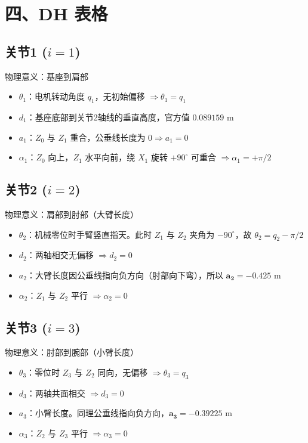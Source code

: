 \documentclass[a4paper,12pt]{article}
\begin{document}
\section*{四、DH 表格}
\subsection*{关节1 ($i=1$)}
物理意义：基座到肩部
\begin{itemize}
    \item $\theta_1$：电机转动角度 $q_1$，无初始偏移 $\Rightarrow \theta_1 = q_1$
    \item $d_1$：基座底部到关节2轴线的垂直高度，官方值 $0.089159$ m
    \item $a_1$：$Z_0$ 与 $Z_1$ 重合，公垂线长度为 $0 \Rightarrow a_1 = 0$
    \item $\alpha_1$：$Z_0$ 向上，$Z_1$ 水平向前，绕 $X_1$ 旋转 $+90^\circ$ 可重合 $\Rightarrow \alpha_1 = +\pi/2$
\end{itemize}

\subsection*{关节2 ($i=2$)}
物理意义：肩部到肘部（大臂长度）
\begin{itemize}
    \item $\theta_2$：机械零位时手臂竖直指天。此时 $Z_1$ 与 $Z_2$ 夹角为 $-90^\circ$，故 $\theta_2 = q_2 - \pi/2$
    \item $d_2$：两轴相交无偏移 $\Rightarrow d_2 = 0$
    \item $a_2$：大臂长度因公垂线指向负方向（肘部向下弯），所以 $\mathbf{a_2 = -0.425}$ m
    \item $\alpha_2$：$Z_1$ 与 $Z_2$ 平行 $\Rightarrow \alpha_2 = 0$
\end{itemize}

\subsection*{关节3 ($i=3$)}
物理意义：肘部到腕部（小臂长度）
\begin{itemize}
    \item $\theta_3$：零位时 $Z_3$ 与 $Z_2$ 同向，无偏移 $\Rightarrow \theta_3 = q_3$
    \item $d_3$：两轴共面相交 $\Rightarrow d_3 = 0$
    \item $a_3$：小臂长度。同理公垂线指向负方向，$\mathbf{a_3 = -0.39225}$ m
    \item $\alpha_3$：$Z_2$ 与 $Z_3$ 平行 $\Rightarrow \alpha_3 = 0$
\end{itemize}
\end{document}
